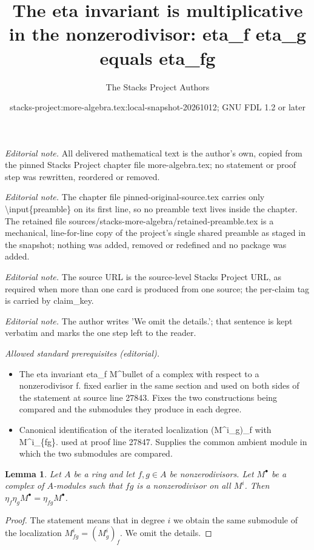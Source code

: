 \documentclass[10pt,a4paper]{amsart}
\title{The eta invariant is multiplicative in the nonzerodivisor: eta\_f eta\_g equals eta\_fg}
\author{The Stacks Project Authors}
\date{stacks-project:more-algebra.tex:local-snapshot-20261012; GNU FDL 1.2 or later}
\theoremstyle{plain}
\newtheorem{lemma}[subsection]{Lemma}
\theoremstyle{definition}
\theoremstyle{remark}
\numberwithin{equation}{subsection}
\begin{document}
\maketitle
\setcounter{subsection}{1}
\noindent\textit{Editorial note.} All delivered mathematical text is the author's own, copied from the pinned Stacks Project chapter file more-algebra.tex; no statement or proof step was rewritten, reordered or removed.\par\medskip
\noindent\textit{Editorial note.} The chapter file pinned-original-source.tex carries only \textbackslash{}input\{preamble\} on its first line, so no preamble text lives inside the chapter. The retained file sources/stacks-more-algebra/retained-preamble.tex is a mechanical, line-for-line copy of the project's single shared preamble as staged in the snapshot; nothing was added, removed or redefined and no package was added.\par\medskip
\noindent\textit{Editorial note.} The source URL is the source-level Stacks Project URL, as required when more than one card is produced from one source; the per-claim tag is carried by claim\_key.\par\medskip
\noindent\textit{Editorial note.} The author writes 'We omit the details.'; that sentence is kept verbatim and marks the one step left to the reader.\par\medskip
\noindent\textit{Allowed standard prerequisites (editorial).}\begin{itemize}
\item The eta invariant eta\_f M\textasciicircum{}bullet of a complex with respect to a nonzerodivisor f. fixed earlier in the same section and used on both sides of the statement at source line 27843. Fixes the two constructions being compared and the submodules they produce in each degree.
\item Canonical identification of the iterated localization (M\textasciicircum{}i\_g)\_f with M\textasciicircum{}i\_\{fg\}. used at proof line 27847. Supplies the common ambient module in which the two submodules are compared.
\end{itemize}\medskip
\begin{lemma}
\label{lemma-eta-third-property}
Let $A$ be a ring and let $f, g \in A$ be nonzerodivisors. Let $M^\bullet$ be
a complex of $A$-modules such that $fg$ is a nonzerodivisor on all $M^i$.
Then $\eta_f\eta_gM^\bullet = \eta_{fg}M^\bullet$.
\end{lemma}

\begin{proof}
The statement means that in degree $i$ we obtain the same submodule
of the localization $M^i_{fg} = (M^i_g)_f$. We omit the details.
\end{proof}
\end{document}
